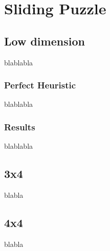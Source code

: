 
\chapter{Sliding Puzzle} %

\label{Chapter4} %


\section{Low dimension}

blablabla

\subsection{Perfect Heuristic}

blablabla


\subsection{Results}

blablabla


\section{3x4}

blabla


\section{4x4}

blabla
